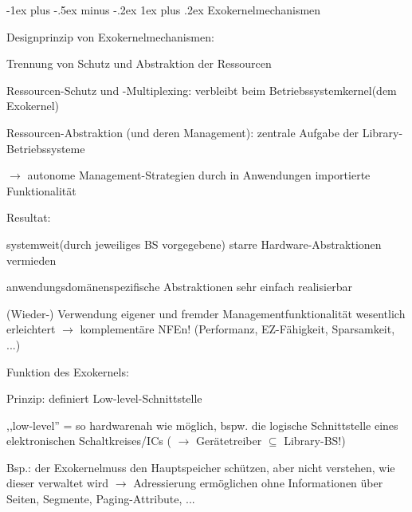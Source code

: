 \documentclass[a4paper]{article}
\makeatletter
\renewcommand{\subsubsection}{\@startsection{subsubsection}{3}{0mm}%
 {-1ex plus -.5ex minus -.2ex}%
 {1ex plus .2ex}%
 {\normalfont\small\bfseries}}
\makeatother
\begin{document}
\begin{multicols}{3}
    \subsubsection{Exokernelmechanismen}

    \begin{itemize*}
        \item Designprinzip von Exokernelmechanismen:
        \begin{itemize*}
            \item Trennung von Schutz und Abstraktion der Ressourcen
            \item Ressourcen-Schutz und -Multiplexing: verbleibt beim Betriebssystemkernel(dem Exokernel)
            \item Ressourcen-Abstraktion (und deren Management): zentrale Aufgabe der Library-Betriebssysteme \begin{itemize*} \item[$\rightarrow$] autonome Management-Strategien durch in Anwendungen importierte Funktionalität \end{itemize*}
            \item Resultat: \begin{enumerate*} \item systemweit(durch jeweiliges BS vorgegebene) starre Hardware-Abstraktionen vermieden \item anwendungsdomänenspezifische Abstraktionen sehr einfach realisierbar \item (Wieder-) Verwendung eigener und fremder Managementfunktionalität wesentlich erleichtert $\rightarrow$ komplementäre NFEn! (Performanz, EZ-Fähigkeit, Sparsamkeit, ...) \end{enumerate*}
        \end{itemize*}
        \item Funktion des Exokernels:
        \begin{itemize*}
            \item Prinzip: definiert Low-level-Schnittstelle \begin{itemize*} \item ,,low-level'' = so hardwarenah wie möglich, bspw. die logische Schnittstelle eines elektronischen Schaltkreises/ICs ( $\rightarrow$ Gerätetreiber $\subseteq$ Library-BS!) \item Bsp.: der Exokernelmuss den Hauptspeicher schützen, aber nicht verstehen, wie dieser verwaltet wird $\rightarrow$ Adressierung ermöglichen ohne Informationen über Seiten, Segmente, Paging-Attribute, ... \end{itemize*}

\end{itemize*}
\end{itemize*}
\end{multicols}
\end{document}
